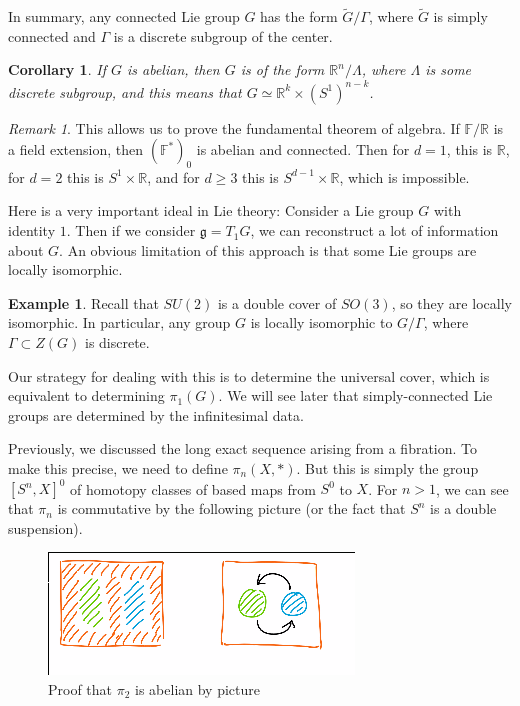 \documentclass[leqno, openany]{memoir}
\newtheorem{cor}[thm]{Corollary}
\theoremstyle{definition}
\newtheorem{exm}[thm]{Example}
\theoremstyle{remark}
\newtheorem{rmk}[thm]{Remark}
\theoremstyle{plain}
\theoremstyle{definition}
\theoremstyle{remark}
\newcommand{\F}{\mathbb{F}}
\newcommand{\R}{\mathbb{R}}
\newcommand{\mf}[1]{\mathfrak{#1}}
\newcommand{\wt}[1]{\widetilde{#1}}
\begin{document}
In summary, any connected Lie group $G$ has the form $\wt{G} / \Gamma$, where $\wt{G}$ is simply connected and $\Gamma$ is a discrete subgroup of the center.

\begin{cor}
    If $G$ is abelian, then $G$ is of the form $\R^n / \Lambda$, where $\Lambda$ is some discrete subgroup, and this means that $G \simeq \R^k \times (S^1)^{n-k}$.
\end{cor}

\begin{rmk}
    This allows us to prove the fundamental theorem of algebra. If $\F/\R$ is a field extension, then $( \F^* )_0$ is abelian and connected. Then for $d = 1$, this is $\R$, for $d = 2$ this is $S^1 \times \R$, and for $d \geq 3$ this is $S^{d-1} \times \R$, which is impossible.
\end{rmk}


Here is a very important ideal in Lie theory: Consider a Lie group $G$ with identity $1$. Then if we consider $\mf{g} = T_1 G$, we can reconstruct a lot of information about $G$. An obvious limitation of this approach is that some Lie groups are locally isomorphic.

\begin{exm}
    Recall that $SU(2)$ is a double cover of $SO(3)$, so they are locally isomorphic. In particular, any group $G$ is locally isomorphic to $G / \Gamma$, where $\Gamma \subset Z(G)$ is discrete.
\end{exm}

Our strategy for dealing with this is to determine the universal cover, which is equivalent to determining $\pi_1(G)$. We will see later that simply-connected Lie groups are determined by the infinitesimal data.

Previously, we discussed the long exact sequence arising from a fibration. To make this precise, we need to define $\pi_n(X,*)$. But this is simply the group $[S^n, X]^0$ of homotopy classes of based maps from $S^0$ to $X$. For $n > 1$, we can see that $\pi_n$ is commutative by the following picture (or the fact that $S^n$ is a double suspension).
\begin{figure}[H]
    \centering
    \includegraphics[width=0.8\linewidth]{pinab}
    \caption{Proof that $\pi_2$ is abelian by picture}%
    \label{fig:pinab}
\end{figure}
\end{document}

